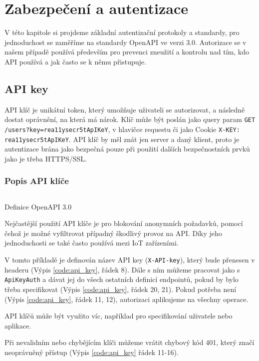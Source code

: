 \chapter{Zabezpečení a autentizace}
V této kapitole si projdeme základní autentizační protokoly a standardy, pro jednoduchost se zaměříme na standardy OpenAPI ve verzi 3.0. Autorizace se v našem případě používá především pro prevenci zneužití a kontrolu nad tím, kdo API používá a jak často se k němu přistupuje.


\section{API key}
API klíč je unikátní token, který umožňuje uživateli se autorizovat, a následně dostat oprávnění, na která má nárok. Klíč může být poslán jako query param \texttt{GET /users?key=rea11ysecr5tApIKeY}, v hlavičce requestu či jako Cookie \texttt{X-KEY: rea11ysecr5tApIKeY}. API klíč by měl znát jen server a daný klient, proto je autentizace brána jako bezpečná pouze při použití dalších bezpečnostních prvků jako je třeba HTTPS/SSL. \cite{swaggerApiKeys} \cite{fortinetApiKeys}

\subsection{Popis API klíče}
\begin{listing}[ht]
    \inputminted[]{yaml}{resources/code/security/openapi-key.yml}
    \caption{Definice OpenAPI 3.0 \cite{swaggerApiKeys}}
    \label{code:api_key}
\end{listing}

Nejčastější použití API klíče je pro blokování anonymních požadavků, pomocí čehož je možné vyfiltrovat případný škodlivý provoz na API. Díky jeho jednoduchosti se také často používá mezi IoT zařízeními.

V tomto příkladě je definován název API key (\texttt{X-API-key}), který bude přenesen v headeru (Výpis \ref{code:api_key}, řádek 8). Dále s ním můžeme pracovat jako s \texttt{ApiKeyAuth} a dávat jej do všech ostatních definicí endpointů, pokud by bylo třeba specifikovat (Výpis \ref{code:api_key}, řádek 20, 21). Pokud potřeba není (Výpis \ref{code:api_key}, řádek 11, 12), autorizaci aplikujeme na všechny operace.

API klíčů může být využito víc, například pro specifikování uživatele nebo aplikace.

Při nevalidním nebo chybějícím klíči můžeme vrátit chybový kód 401, který značí neoprávněný přístup (Výpis \ref{code:api_key} řádek 11-16).


